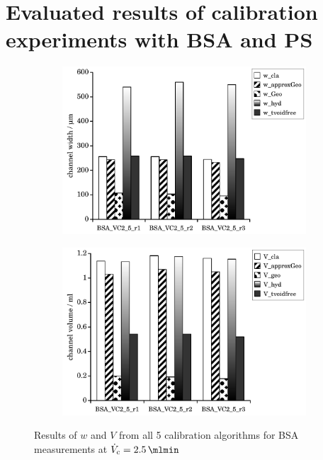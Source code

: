 \section*{Evaluated results of calibration experiments with BSA and PS}
\renewcommand{\subFigSize}{0.49\linewidth}
\begin{figure}[htp]
  \begin{center}
    \begin{subfigure}{\subFigSize}
      \includegraphics[width=\linewidth]{./images/data/img_calibW_BSA_VC_2_5.pdf}
      \label{subfig:calibRes_BSA_VC2_5_w}
    \end{subfigure}
    \begin{subfigure}{\subFigSize}
      \includegraphics[width=\linewidth]{./images/data/img_calibV_BSA_VC_2_5.pdf}
    \end{subfigure}
  \end{center}
  \vspace*{-4ex}    
  \caption[Results of $w$ and $V$ from all 5 calibration algorithms for BSA measurements at
   $\Vc = \SI{2.5}{\mlmin}$]{
     Results of $w$ and $V$ from all 5 calibration algorithms for BSA measurements at
     $\Vc = \SI{2.5}{\mlmin}$
}
\label{fig:calibRes_BSA_VC2_5}
\end{figure}  
